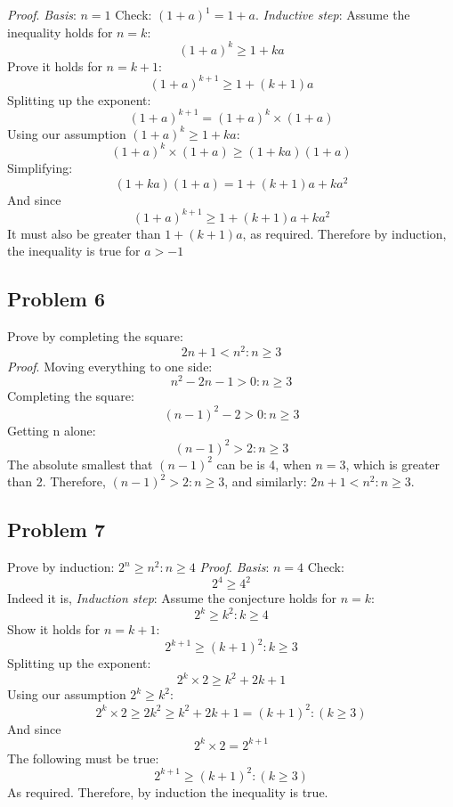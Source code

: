\documentclass[12pt]{article}
\begin{document}
\newline\emph{Proof}. \emph{Basis}: $n=1$ Check: $\left(1+a\right)^1=1+a$.
\newline\emph{Inductive step}: Assume the inequality holds for $n=k$: $$\left(1+a\right)^k \geq 1+ka$$
Prove it holds for $n=k+1$: $$\left(1+a\right)^{k+1}\geq 1+\left(k+1\right)a$$Splitting up the exponent:$$\left(1+a\right)^{k+1}=\left(1+a\right)^k\times\left(1+a\right)$$Using our assumption $\left(1+a\right)^k \geq 1+ka$:$$\left(1+a\right)^k\times\left(1+a\right)\geq \left(1+ka\right)\left(1+a\right)$$Simplifying:$$\left(1+ka\right)\left(1+a\right)=1+\left(k+1\right)a+ka^2$$And since $$\left(1+a\right)^{k+1}\geq 1+\left(k+1\right)a+ka^2$$It must also be greater than $1+\left(k+1\right)a$, as required. Therefore by induction, the inequality is true for $a>-1$
\newline \subsection*{Problem 6}
Prove by completing the square: $$2n+1<n^2:n\geq3$$
\emph{Proof}. Moving everything to one side:$$n^2-2n-1>0:n\geq3$$Completing the square:$$\left(n-1\right)^2-2>0:n\geq3$$Getting n alone:$$\left(n-1\right)^2>2:n\geq3$$The absolute smallest that $\left(n-1\right)^2$ can be is 4, when $n=3$, which is greater than 2. Therefore, $\left(n-1\right)^2>2:n\geq3$, and similarly: $2n+1<n^2:n\geq3$.
\newpage
\subsection*{Problem 7}
Prove by induction: $2^n\geq n^2:n\geq4$
\newline \emph{Proof}. \emph{Basis}: $n=4$ Check: $$2^4\geq 4^2$$ Indeed it is, \emph{Induction step}: Assume the conjecture holds for $n=k$:$$2^k\geq k^2:k\geq4$$Show it holds for $n=k+1$:$$2^{k+1}\geq \left(k+1\right)^2:k\geq3$$Splitting up the exponent:$$2^k\times2\geq k^2+2k+1$$Using our assumption $2^k\geq k^2$:$$2^k\times2\geq2k^2\geq k^2+2k+1=\left(k+1\right)^2:\left(k\geq3\right)$$And since $$2^k\times2=2^{k+1}$$The following must be true:$$2^{k+1}\geq\left(k+1\right)^2:\left(k\geq3\right)$$As required. Therefore, by induction the inequality is true.
\end{document}
